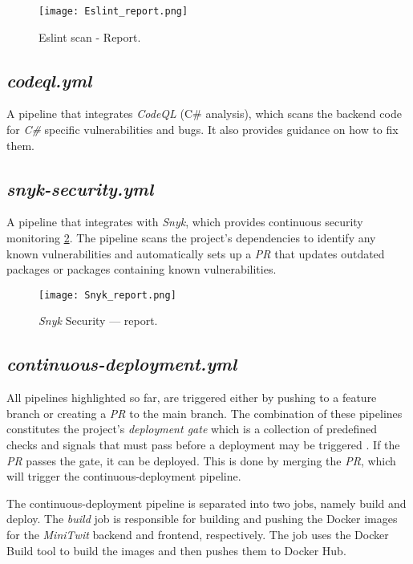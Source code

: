 \begin{figure}[H]
    \centering
    \texttt{[image: Eslint\_report.png]}
    \caption{Eslint scan - Report.}
    \label{fig:elsint_report}
\end{figure}

\subsection{\textit{codeql.yml}}

A pipeline that integrates \textit{CodeQL} (C\# analysis), which scans the backend code for \textit{C\#} specific vulnerabilities and bugs. It also provides guidance on how to fix them.

\subsection{\textit{snyk-security.yml}}

A pipeline that integrates with \textit{Snyk}, which provides continuous security monitoring \ref{fig:snyk_report}. The pipeline scans the project's dependencies to identify any known vulnerabilities and automatically sets up a \textit{PR} that updates outdated packages or packages containing known vulnerabilities. 

\begin{figure}[H]
    \centering
    \texttt{[image: Snyk\_report.png]}
    \caption{\textit{Snyk} Security --- report.}
    \label{fig:snyk_report}
\end{figure}

\subsection{\textit{continuous-deployment.yml}}

All pipelines highlighted so far, are triggered either by pushing to a feature branch or creating a \textit{PR} to the main branch. The combination of these pipelines constitutes the project's \textit{deployment gate} which is a collection of predefined checks and signals that must pass before a deployment may be triggered \cite{DevOps_gates}. If the \textit{PR} passes the gate, it can be deployed. This is done by merging the \textit{PR}, which will trigger the continuous-deployment pipeline.

The continuous-deployment pipeline is separated into two jobs, namely build and deploy. The \textit{build} job is responsible for building and pushing the Docker images for the \textit{MiniTwit} backend and frontend, respectively. The job uses the Docker Build tool to build the images and then pushes them to Docker Hub.

